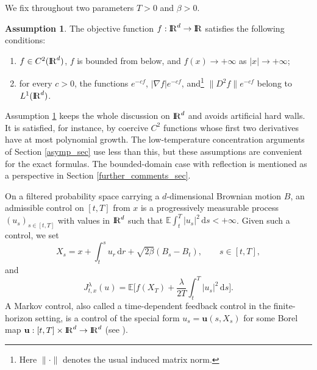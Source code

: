 \documentclass[11pt]{amsart}
\def\R{\mathrm{I\kern-0.21emR}}
\newcommand{\E}{\mathbb{E}}
\newcommand{\dd}{\,\mathrm{d}}
\renewcommand{\Vert}{|}
\numberwithin{equation}{section}
\numberwithin{figure}{section}
\theoremstyle{definition}\newtheorem{remark}[theorem]{Remark}%
\newtheorem{assumption}[theorem]{Assumption}
\begin{document}
We fix throughout two parameters $T > 0$ and $\beta > 0$.

\begin{assumption}\label{basic_ass}
The objective function $f : \R^d \to \R$ satisfies the following conditions:
\begin{enumerate}[label=\roman*)]
\item $f \in C^2(\R^d)$, $f$ is bounded from below, and $f(x) \to +\infty$ as $\Vert x \Vert \to +\infty$;
\item for every $c > 0$, the functions $e^{-cf}$, $\Vert \nabla f \Vert e^{-cf}$, and\footnote{Here $\| \cdot \|$ denotes the usual induced matrix norm.} $\| D^2 f \| e^{-cf}$ belong to $L^1(\R^d)$.
\end{enumerate}

\end{assumption}

Assumption \ref{basic_ass} keeps the whole discussion on $\R^d$ and avoids artificial hard walls. It is satisfied, for instance, by coercive $C^2$ functions whose first two derivatives have at most polynomial growth. The low-temperature concentration arguments of Section \ref{asymp_sec} use less than this, but these assumptions are convenient for the exact formulas. The bounded-domain case with reflection is mentioned as a perspective in Section \ref{further_comments_sec}.

On a filtered probability space carrying a $d$-dimensional Brownian motion $B$, an admissible control on $[t,T]$ from $x$ is a progressively measurable process $(u_s)_{s \in [t,T]}$ with values in $\R^d$ such that $\displaystyle \E \int_t^T \Vert u_s \Vert^2 \dd s < +\infty$.
Given such a control, we set
$$
X_s = x + \int_t^s u_r \dd r + \sqrt{2\beta}(B_s - B_t),
\qquad
s \in [t,T],
$$
and
\begin{equation}\label{def_Jtx}
J^\lambda_{t,x}(u) = \E \bigg[ f(X_T) + \frac{\lambda}{2T}\int_t^T \Vert u_s \Vert^2 \dd s \bigg].
\end{equation}
A Markov control, also called a time-dependent feedback control in the finite-horizon setting, is a control of the special form $u_s = \mathbf u(s,X_s)$ for some Borel map $\mathbf u : [t,T] \times \R^d \to \R^d$ (see \cite{FlemingSoner06, YongZhou99}).
\end{document}
